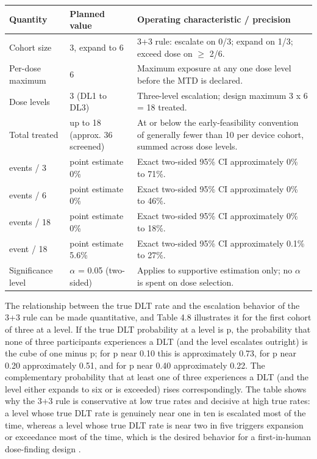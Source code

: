 \noindent\begin{tabularx}{\textwidth}{L{2.8cm} L{3.0cm} Y}
\toprule
\textbf{Quantity} & \textbf{Planned value} & \textbf{Operating characteristic / precision} \\
\midrule
Cohort size & 3, expand to 6 & 3+3 rule: escalate on 0/3; expand on 1/3; exceed dose on $\geq$ 2/6. \\
\addlinespace
Per-dose maximum & 6 & Maximum exposure at any one dose level before the MTD is declared. \\
\addlinespace
Dose levels & 3 (DL1 to DL3) & Three-level escalation; design maximum 3 x 6 = 18 treated. \\
\addlinespace
Total treated & up to 18 (approx. 36 screened) & At or below the early-feasibility convention of generally fewer than 10 per device cohort, summed across dose levels. \\
 events / 3 & point estimate 0\% & Exact two-sided 95\% CI approximately 0\% to 71\%. \\
 events / 6 & point estimate 0\% & Exact two-sided 95\% CI approximately 0\% to 46\%. \\
 events / 18 & point estimate 0\% & Exact two-sided 95\% CI approximately 0\% to 18\%. \\
 event / 18 & point estimate 5.6\% & Exact two-sided 95\% CI approximately 0.1\% to 27\%. \\
\addlinespace
Significance level & $\alpha$ = 0.05 (two-sided) & Applies to supportive estimation only; no $\alpha$ is spent on dose selection. \\
\bottomrule
\end{tabularx}

The relationship between the true DLT rate and the escalation behavior of the 3+3
rule can be made quantitative, and Table 4.8 illustrates it for the first cohort of
three at a level. If the true DLT probability at a level is p, the probability that
none of three participants experiences a DLT (and the level escalates outright) is
the cube of one minus p; for p near 0.10 this is approximately 0.73, for p near 0.20
approximately 0.51, and for p near 0.40 approximately 0.22. The complementary
probability that at least one of three experiences a DLT (and the level either
expands to six or is exceeded) rises correspondingly. The table shows why the 3+3
rule is conservative at low true rates and decisive at high true rates: a level whose
true DLT rate is genuinely near one in ten is escalated most of the time, whereas a
level whose true DLT rate is near two in five triggers expansion or exceedance most
of the time, which is the desired behavior for a first-in-human dose-finding design
\cite{phase1guidance,ichpaistduni}.

